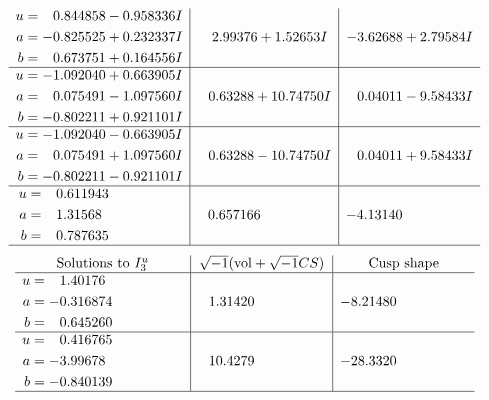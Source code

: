 \documentclass[1p]{elsarticle_modified}
\theoremstyle{definition}
\newcommand{\I}{\sqrt{-1}}
\begin{document}
$$\begin{array}{c|c|c}
\begin{aligned}
u &= \phantom{-}0.844858 - 0.958336 I \\
a &= -0.825525 + 0.232337 I \\
b &= \phantom{-}0.673751 + 0.164556 I\end{aligned}
 & \phantom{-}2.99376 + 1.52653 I & -3.62688 + 2.79584 I \\ \hline\begin{aligned}
u &= -1.092040 + 0.663905 I \\
a &= \phantom{-}0.075491 - 1.097560 I \\
b &= -0.802211 + 0.921101 I\end{aligned}
 & \phantom{-}0.63288 + 10.74750 I & \phantom{-}0.04011 - 9.58433 I \\ \hline\begin{aligned}
u &= -1.092040 - 0.663905 I \\
a &= \phantom{-}0.075491 + 1.097560 I \\
b &= -0.802211 - 0.921101 I\end{aligned}
 & \phantom{-}0.63288 - 10.74750 I & \phantom{-}0.04011 + 9.58433 I \\ \hline\begin{aligned}
u &= \phantom{-}0.611943\phantom{ +0.000000I} \\
a &= \phantom{-}1.31568\phantom{ +0.000000I} \\
b &= \phantom{-}0.787635\phantom{ +0.000000I}\end{aligned}
 & \phantom{-}0.657166\phantom{ +0.000000I} & -4.13140\phantom{ +0.000000I}\\
 \hline 
 \end{array}$$\newpage$$\begin{array}{c|c|c}  
\text{Solutions to }I^u_{3}& \I (\text{vol} + \sqrt{-1}CS) & \text{Cusp shape}\\
 \hline 
\begin{aligned}
u &= \phantom{-}1.40176\phantom{ +0.000000I} \\
a &= -0.316874\phantom{ +0.000000I} \\
b &= \phantom{-}0.645260\phantom{ +0.000000I}\end{aligned}
 & \phantom{-}1.31420\phantom{ +0.000000I} & -8.21480\phantom{ +0.000000I} \\ \hline\begin{aligned}
u &= \phantom{-}0.416765\phantom{ +0.000000I} \\
a &= -3.99678\phantom{ +0.000000I} \\
b &= -0.840139\phantom{ +0.000000I}\end{aligned}
 & \phantom{-}10.4279\phantom{ +0.000000I} & -28.3320\phantom{ +0.000000I}\\
 \hline 
 \end{array}$$\newpage\newpage\renewcommand{\arraystretch}{1}
\end{document}
